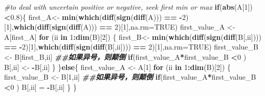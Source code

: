 \documentclass[
]{article}
\newenvironment{Shaded}{\begin{snugshade}}{\end{snugshade}}
\newcommand{\AttributeTok}[1]{\textcolor[rgb]{0.13,0.29,0.53}{#1}}
\newcommand{\CommentTok}[1]{\textcolor[rgb]{0.56,0.35,0.01}{\textit{#1}}}
\newcommand{\ConstantTok}[1]{\textcolor[rgb]{0.56,0.35,0.01}{#1}}
\newcommand{\ControlFlowTok}[1]{\textcolor[rgb]{0.13,0.29,0.53}{\textbf{#1}}}
\newcommand{\DecValTok}[1]{\textcolor[rgb]{0.00,0.00,0.81}{#1}}
\newcommand{\DocumentationTok}[1]{\textcolor[rgb]{0.56,0.35,0.01}{\textbf{\textit{#1}}}}
\newcommand{\FloatTok}[1]{\textcolor[rgb]{0.00,0.00,0.81}{#1}}
\newcommand{\FunctionTok}[1]{\textcolor[rgb]{0.13,0.29,0.53}{\textbf{#1}}}
\newcommand{\NormalTok}[1]{#1}
\newcommand{\OtherTok}[1]{\textcolor[rgb]{0.56,0.35,0.01}{#1}}
\newcommand{\SpecialCharTok}[1]{\textcolor[rgb]{0.81,0.36,0.00}{\textbf{#1}}}
\begin{document}
\begin{Shaded}
\begin{Highlighting}[]
\CommentTok{\#to deal with uncertain positive or negative, seek first min or max}
\ControlFlowTok{if}\NormalTok{(}\FunctionTok{abs}\NormalTok{(A[}\DecValTok{1}\NormalTok{])}\SpecialCharTok{\textless{}}\FloatTok{0.8}\NormalTok{)\{}
\NormalTok{  first\_A}\OtherTok{\textless{}{-}} \FunctionTok{min}\NormalTok{(}\FunctionTok{which}\NormalTok{(}\FunctionTok{diff}\NormalTok{(}\FunctionTok{sign}\NormalTok{(}\FunctionTok{diff}\NormalTok{(A))) }\SpecialCharTok{==} \SpecialCharTok{{-}}\DecValTok{2}\NormalTok{)[}\DecValTok{1}\NormalTok{],}\FunctionTok{which}\NormalTok{(}\FunctionTok{diff}\NormalTok{(}\FunctionTok{sign}\NormalTok{(}\FunctionTok{diff}\NormalTok{(A))) }\SpecialCharTok{==} \DecValTok{2}\NormalTok{)[}\DecValTok{1}\NormalTok{],}\AttributeTok{na.rm=}\ConstantTok{TRUE}\NormalTok{)}
\NormalTok{  first\_value\_A }\OtherTok{\textless{}{-}}\NormalTok{ A[first\_A]  }
    \ControlFlowTok{for}\NormalTok{ (ii }\ControlFlowTok{in} \DecValTok{1}\SpecialCharTok{:}\FunctionTok{dim}\NormalTok{(B)[}\DecValTok{2}\NormalTok{]) \{}
\NormalTok{      first\_B}\OtherTok{\textless{}{-}} \FunctionTok{min}\NormalTok{(}\FunctionTok{which}\NormalTok{(}\FunctionTok{diff}\NormalTok{(}\FunctionTok{sign}\NormalTok{(}\FunctionTok{diff}\NormalTok{(B[,ii]))) }\SpecialCharTok{==} \SpecialCharTok{{-}}\DecValTok{2}\NormalTok{)[}\DecValTok{1}\NormalTok{],}\FunctionTok{which}\NormalTok{(}\FunctionTok{diff}\NormalTok{(}\FunctionTok{sign}\NormalTok{(}\FunctionTok{diff}\NormalTok{(B[,ii]))) }\SpecialCharTok{==} \DecValTok{2}\NormalTok{)[}\DecValTok{1}\NormalTok{],}\AttributeTok{na.rm=}\ConstantTok{TRUE}\NormalTok{)}
\NormalTok{      first\_value\_B }\OtherTok{\textless{}{-}}\NormalTok{ B[first\_B,ii]  }
      \DocumentationTok{\#\#如果异号，则颠倒}
      \ControlFlowTok{if}\NormalTok{(first\_value\_A}\SpecialCharTok{*}\NormalTok{first\_value\_B }\SpecialCharTok{\textless{}}\DecValTok{0}\NormalTok{ )}
\NormalTok{        B[,ii] }\OtherTok{\textless{}{-}} \SpecialCharTok{{-}}\NormalTok{B[,ii]}
\NormalTok{    \}}
\NormalTok{\}}\ControlFlowTok{else}\NormalTok{\{}
\NormalTok{    first\_value\_A }\OtherTok{\textless{}{-}}\NormalTok{ A[}\DecValTok{1}\NormalTok{] }
    \ControlFlowTok{for}\NormalTok{ (ii }\ControlFlowTok{in} \DecValTok{1}\SpecialCharTok{:}\FunctionTok{dim}\NormalTok{(B)[}\DecValTok{2}\NormalTok{]) \{}
\NormalTok{      first\_value\_B }\OtherTok{\textless{}{-}}\NormalTok{ B[}\DecValTok{1}\NormalTok{,ii]  }
      \DocumentationTok{\#\#如果异号，则颠倒}
      \ControlFlowTok{if}\NormalTok{(first\_value\_A}\SpecialCharTok{*}\NormalTok{first\_value\_B }\SpecialCharTok{\textless{}}\DecValTok{0}\NormalTok{ )}
\NormalTok{        B[,ii] }\OtherTok{=} \SpecialCharTok{{-}}\NormalTok{B[,ii]}
\NormalTok{    \}}
\NormalTok{\}}


\end{Highlighting}
\end{Shaded}
\end{document}
